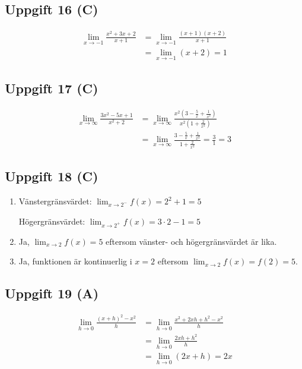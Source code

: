 \documentclass[12pt]{article}
\begin{document}
\subsection*{Uppgift 16 (C)}
\begin{facitbox}
\begin{align*}
\lim_{x \to -1} \frac{x^2 + 3x + 2}{x + 1} &= \lim_{x \to -1} \frac{(x + 1)(x + 2)}{x + 1} \\
&= \lim_{x \to -1} (x + 2) = 1
\end{align*}
\end{facitbox}

\subsection*{Uppgift 17 (C)}
\begin{facitbox}
\begin{align*}
\lim_{x \to \infty} \frac{3x^2 - 5x + 1}{x^2 + 2} &= \lim_{x \to \infty} \frac{x^2(3 - \frac{5}{x} + \frac{1}{x^2})}{x^2(1 + \frac{2}{x^2})} \\
&= \lim_{x \to \infty} \frac{3 - \frac{5}{x} + \frac{1}{x^2}}{1 + \frac{2}{x^2}} = \frac{3}{1} = 3
\end{align*}
\end{facitbox}

\subsection*{Uppgift 18 (C)}
\begin{facitbox}
\begin{enumerate}[label=\alph*)]
    \item Vänstergränsvärdet: $\lim_{x \to 2^-} f(x) = 2^2 + 1 = 5$
    
    Högergränsvärdet: $\lim_{x \to 2^+} f(x) = 3 \cdot 2 - 1 = 5$
    
    \item Ja, $\lim_{x \to 2} f(x) = 5$ eftersom vänster- och högergränsvärdet är lika.
    
    \item Ja, funktionen är kontinuerlig i $x = 2$ eftersom $\lim_{x \to 2} f(x) = f(2) = 5$.
\end{enumerate}
\end{facitbox}

\subsection*{Uppgift 19 (A)}
\begin{facitbox}
\begin{align*}
\lim_{h \to 0} \frac{(x + h)^2 - x^2}{h} &= \lim_{h \to 0} \frac{x^2 + 2xh + h^2 - x^2}{h} \\
&= \lim_{h \to 0} \frac{2xh + h^2}{h} \\
&= \lim_{h \to 0} (2x + h) = 2x
\end{align*}
\end{facitbox}
\end{document}
